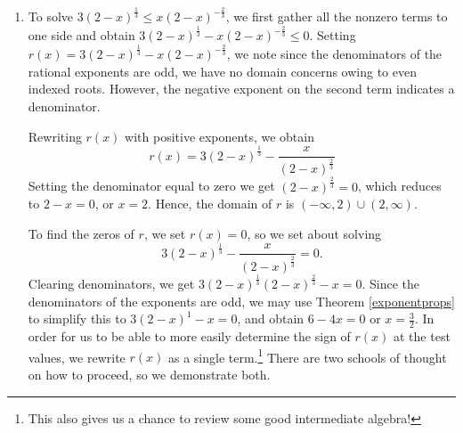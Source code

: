 \documentclass{ximera}
\begin{document}
\begin{example}
\begin{enumerate}
\begin{image}
% 
\end{image}

We find $r(t) = t^{\frac{4}{3}} -t^{\frac{2}{3}} - 6 > 0$  on $\left(-\infty, -3 \sqrt{3}\right)\cup \left(3 \sqrt{3}, \infty\right)$.  To check our answer graphically, we set $f(t) = t^{\frac{2}{3}}$ and $g(t) = t^{\frac{4}{3}}-6$.  The solution to  $t^{\frac{2}{3}} < t^{\frac{4}{3}} - 6$ corresponds to the inequality $f(t) < g(t)$, which means we are looking for the $t$ values for which the graph of $f$ is \textit{below} the graph of $g$.  Using desmos, we see the graph of $y = f(t) = t^{\frac{2}{3}}$  is below the graph of $y = g(t) = t^{\frac{4}{3}}-6$ for $t < - 5.196$ and again for $t > 5.196$, which are desmos's approximations to $\pm 3 \sqrt{3}$.




\begin{center}
\end{center}


\item  To solve $3 (2-x)^{\frac{1}{3}} \leq x (2-x)^{-\frac{2}{3}}$, we first gather all the nonzero terms to one side and obtain $3 (2-x)^{\frac{1}{3}} - x (2-x)^{-\frac{2}{3}} \leq 0$. Setting $r(x) = 3 (2-x)^{\frac{1}{3}} - x (2-x)^{-\frac{2}{3}}$, we note  since the denominators of the rational exponents are odd, we have no domain concerns owing to even indexed roots.  However, the negative exponent on the second term indicates a denominator.  

Rewriting $r(x)$ with positive exponents, we obtain \[r(x) =  3 (2-x)^{\frac{1}{3}} - \frac{x}{(2-x)^{\frac{2}{3}}}\]  Setting the denominator equal to zero we get $(2-x)^{\frac{2}{3}} = 0$, which reduces to  $2-x=0$, or $x=2$.  Hence, the domain of $r$ is $(-\infty, 2) \cup (2, \infty)$. 

To find the zeros of $r$, we set $r(x) = 0$, so we set about solving \[3 (2-x)^{\frac{1}{3}} - \frac{x}{(2-x)^{\frac{2}{3}}} = 0.\] Clearing denominators, we get $3  (2-x)^{\frac{1}{3}} (2-x)^{\frac{2}{3}} - x = 0$.  Since the denominators of the exponents are odd, we may use Theorem \ref{exponentprops} to simplify this to $3(2-x)^{1} - x = 0$, and obtain $6-4x = 0$ or $x = \frac{3}{2}$.  In order for us to be able to more easily determine the sign of $r(x)$ at the test values, we rewrite $r(x)$ as a single term.\footnote{This also gives us a chance to review some good intermediate algebra!}  There are two schools of thought on how to proceed, so we demonstrate both.



\end{enumerate}
\end{example}
\end{document}

